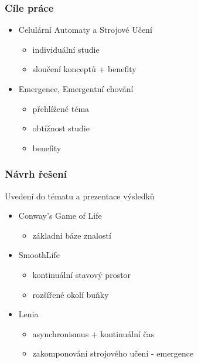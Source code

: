 \documentclass[10pt]{beamer}
\begin{document}
\begin{frame}
	\frametitle{Cíle práce}
	\begin{itemize}[<+->]
		\pause
		\item Celulární Automaty a Strojové Učení
			\begin{itemize}[<2->]
				\item individuální studie
				\item sloučení konceptů + benefity
			\end{itemize}
		\pause
		\vspace{0.2cm}
		\item Emergence, Emergentní chování
			\begin{itemize}[<4->]
				\item přehlížené téma
				\item obtížnost studie
				\item benefity
			\end{itemize}
		\end{itemize}
\end{frame}

\begin{frame}
	\frametitle{Návrh řešení}
	Uvedení do tématu a prezentace výsledků
	\vspace*{0.5cm}
	\begin{itemize}[<+->]
		\pause
		\item Conway's Game of Life
			\begin{itemize}[<2->]
				\item základní báze znalostí
			\end{itemize}
		\pause
		\vspace{0.2cm}
		\item SmoothLife
			\begin{itemize}[<4->]
				\item kontinuální stavový prostor
				\item rozšířené okolí buňky
			\end{itemize}
		\pause
		\vspace{0.2cm}
		\item Lenia
			\begin{itemize}[<6->]
				\item asynchronismus + kontinuální čas
				\item zakomponování strojového učení - emergence
			\end{itemize}
	\end{itemize}
\end{frame}
\end{document}
